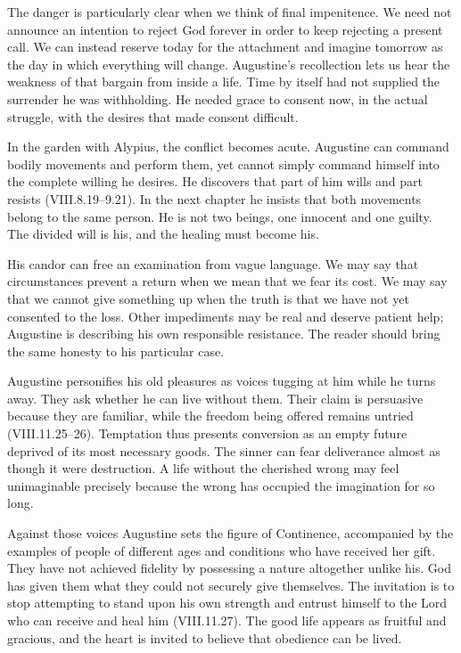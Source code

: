 The danger is particularly clear when we think of final impenitence. We need not announce an intention to reject God forever in order to keep rejecting a present call. We can instead reserve today for the attachment and imagine tomorrow as the day in which everything will change. Augustine's recollection lets us hear the weakness of that bargain from inside a life. Time by itself had not supplied the surrender he was withholding. He needed grace to consent now, in the actual struggle, with the desires that made consent difficult.

In the garden with Alypius, the conflict becomes acute. Augustine can command bodily movements and perform them, yet cannot simply command himself into the complete willing he desires. He discovers that part of him wills and part resists (VIII.8.19--9.21). In the next chapter he insists that both movements belong to the same person. He is not two beings, one innocent and one guilty. The divided will is his, and the healing must become his.

His candor can free an examination from vague language. We may say that circumstances prevent a return when we mean that we fear its cost. We may say that we cannot give something up when the truth is that we have not yet consented to the loss. Other impediments may be real and deserve patient help; Augustine is describing his own responsible resistance. The reader should bring the same honesty to his particular case.

Augustine personifies his old pleasures as voices tugging at him while he turns away. They ask whether he can live without them. Their claim is persuasive because they are familiar, while the freedom being offered remains untried (VIII.11.25--26). Temptation thus presents conversion as an empty future deprived of its most necessary goods. The sinner can fear deliverance almost as though it were destruction. A life without the cherished wrong may feel unimaginable precisely because the wrong has occupied the imagination for so long.

Against those voices Augustine sets the figure of Continence, accompanied by the examples of people of different ages and conditions who have received her gift. They have not achieved fidelity by possessing a nature altogether unlike his. God has given them what they could not securely give themselves. The invitation is to stop attempting to stand upon his own strength and entrust himself to the Lord who can receive and heal him (VIII.11.27). The good life appears as fruitful and gracious, and the heart is invited to believe that obedience can be lived.

